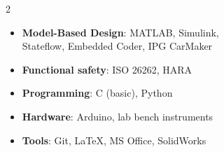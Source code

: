 \vspace{-20pt}

\begin{multicols}{2}
    \begin{itemize}
        \item \textbf{Model-Based Design}: MATLAB, Simulink, \\ Stateflow, Embedded Coder, IPG CarMaker
        \vspace{-2pt}
        \item \textbf{Functional safety}: ISO 26262, HARA
    \end{itemize}
\columnbreak
    \begin{itemize}
        \item \textbf{Programming}: C (basic), Python
        \vspace{-2pt}
        \item \textbf{Hardware}: Arduino, lab bench instruments
        \vspace{-2pt}
        \item \textbf{Tools}: Git, \LaTeX{}, MS Office, SolidWorks
    \end{itemize}
\end{multicols}
